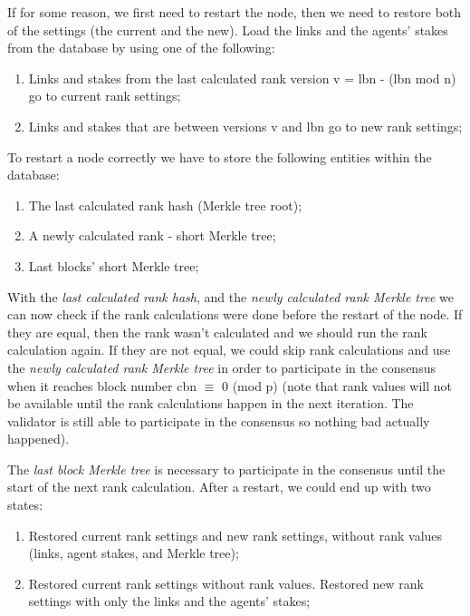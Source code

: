 \documentclass[8pt,oneside]{amsart}
\newcommand{\code}[1]{{\PlayBold #1}}
\begin{document}
\begin{Abstract}
If for some reason, we first need to restart the node, then we need to restore both of the settings (the current and the new).
Load the links and the agents' stakes from the database by using one of the following:

\begin{enumerate}
  \item Links and stakes from the last calculated rank version \code{v = lbn - (lbn mod n)} go to current rank settings;
  \item Links and stakes that are between versions \code{v} and \code{lbn} go to new rank settings;
\end{enumerate}

To restart a node correctly we have to store the following entities within the database:

\begin{enumerate}
  \item The last calculated rank hash (Merkle tree root);
  \item A newly calculated rank - short Merkle tree;
  \item Last blocks' short Merkle tree;
\end{enumerate}

With the \textit{last calculated rank hash}, and the \textit{newly calculated rank Merkle tree} we can now check if the rank
calculations were done before the restart of the node. If they are equal, then the rank wasn't calculated and we should run the rank calculation again.
If they are not equal, we could skip rank calculations and use the \textit{newly calculated rank Merkle tree} in order to participate in the consensus when it reaches block number \code{cbn $\equiv$ 0 (mod p)} (note that rank values will not be available until the rank calculations happen in the next iteration. The validator is still able to participate in the consensus so nothing bad actually happened).

The \textit{last block Merkle tree} is necessary to participate in the consensus until the start of the next rank calculation. After a restart, we could end up with two states:

\begin{enumerate}
\item Restored current rank settings and new rank settings, without rank values (links, agent stakes, and Merkle tree);
\item Restored current rank settings without rank values. Restored new rank settings with only the links and the agents' stakes;
\end{enumerate}


\end{Abstract}
\end{document}

